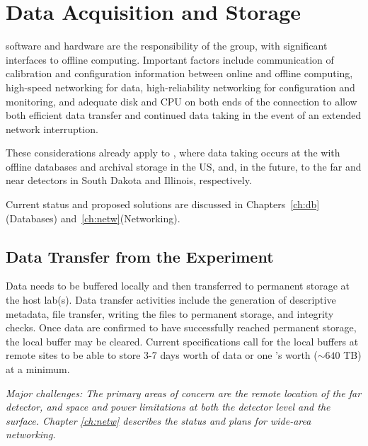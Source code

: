 \documentclass[../main-v1.tex]{subfiles}
\begin{document}





\section{Data Acquisition and Storage}

 software and hardware are the responsibility of the  group, with significant interfaces to offline computing. Important factors include communication of calibration and configuration information between online and offline computing, high-speed networking for data, high-reliability networking for configuration and monitoring, and adequate disk and CPU on both ends of the connection to allow both efficient data transfer and continued data taking in the event of an extended network interruption. 

These considerations already apply to , where data taking occurs at the  with offline databases and archival storage in the US,  and, in the future, to the far and near detectors in South Dakota and Illinois, respectively. 

Current status and proposed solutions are discussed in Chapters~\ref{ch:db}(Databases) and~\ref{ch:netw}(Networking). 

\subsection{Data Transfer from the Experiment}
Data needs to be buffered locally and then transferred to permanent storage at the host lab(s).  Data transfer activities include the generation of descriptive metadata, file transfer, writing the files to permanent storage, and integrity checks.  Once data are confirmed to have successfully reached permanent storage, the local buffer may be cleared.  Current specifications call for the local buffers at remote sites to be able to store 3-7 days worth of data or one 's worth ($\sim 640$ TB) at a minimum. 

{\it Major challenges: %
The %
primary areas of concern are the remote location of the far detector, and space and power limitations at both the  detector level and the surface. Chapter \ref{ch:netw} describes the status and plans for wide-area networking.} %
\end{document}
